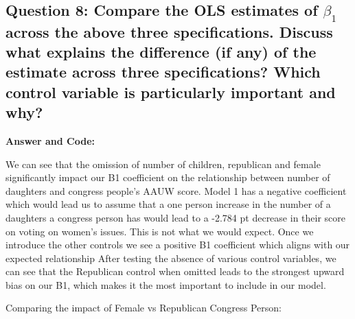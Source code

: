 \documentclass[
]{article}
\begin{document}
\hypertarget{question-8-compare-the-ols-estimates-of-beta_1-across-the-above-three-specifications.-discuss-what-explains-the-difference-if-any-of-the-estimate-across-three-specifications-which-control-variable-is-particularly-important-and-why}{%
\subsection{\texorpdfstring{Question 8: Compare the OLS estimates of
\(\beta_1\) across the above three specifications. Discuss what explains
the difference (if any) of the estimate across three specifications?
Which control variable is particularly important and
why?}{Question 8: Compare the OLS estimates of \textbackslash beta\_1 across the above three specifications. Discuss what explains the difference (if any) of the estimate across three specifications? Which control variable is particularly important and why?}}\label{question-8-compare-the-ols-estimates-of-beta_1-across-the-above-three-specifications.-discuss-what-explains-the-difference-if-any-of-the-estimate-across-three-specifications-which-control-variable-is-particularly-important-and-why}}

\textbf{Answer and Code:}

We can see that the omission of number of children, republican and
female significantly impact our B1 coefficient on the relationship
between number of daughters and congress people's AAUW score. Model 1
has a negative coefficient which would lead us to assume that a one
person increase in the number of a daughters a congress person has would
lead to a -2.784 pt decrease in their score on voting on women's issues.
This is not what we would expect. Once we introduce the other controls
we see a positive B1 coefficient which aligns with our expected
relationship After testing the absence of various control variables, we
can see that the Republican control when omitted leads to the strongest
upward bias on our B1, which makes it the most important to include in
our model.

Comparing the impact of Female vs Republican Congress Person:
\end{document}
